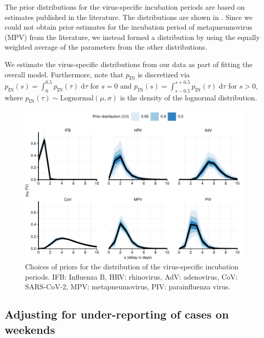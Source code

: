 \documentclass[fleqn,11pt]{wlscirep_supp}
\begin{document}
The prior distributions for the virus-specific incubation periods are based on estimates published in the literature\cite{McAloon2020,Lessler2009LancetID}. The distributions are shown in . Since we could not obtain prior estimates for the incubation period of metapneumovirus (MPV) from the literature, we instead formed a distribution by using the equally weighted average of the parameters from the other distributions. 

We estimate the virus-specific distributions from our data as part of fitting the overall model. Furthermore, note that $p_\text{IN}$ is discretized via $p_\text{IN}(s) = \int_0^{0.5} p_\text{IN}(\tau) \;\text{d}\tau$ for $s = 0$ and $p_\text{IN}(s) = \int_{s-0.5}^{s+0.5} p_\text{IN}(\tau) \;\text{d}\tau$ for $s > 0$, where $p_\text{IN}(\tau) \sim \textrm{Lognormal}(\mu, \sigma)$ is the density of the lognormal distribution. 

\begin{figure}[!htpb]
    \centering
    \includegraphics{../../results/epi-data/incubation-periods.pdf}
    \caption[Choices of priors for the incubation periods]{Choices of priors for the distribution of the virus-specific incubation periods. IFB: Influenza B, HRV: rhinovirus, AdV: adenovirus, CoV: SARS-CoV-2, MPV: metapneumovirus, PIV: parainfluenza virus.}
    \label{fig:prior-pin}
\end{figure}

\subsection{Adjusting for under-reporting of cases on weekends}
\end{document}

